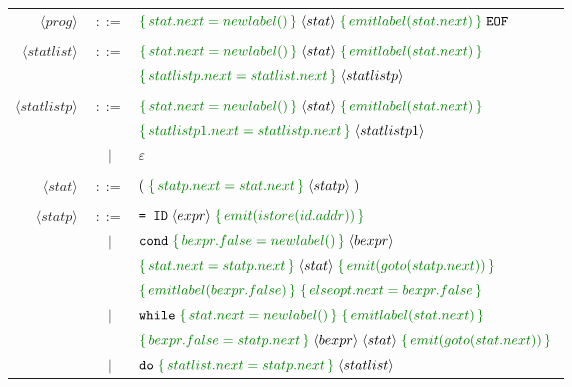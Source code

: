 \documentclass[a4paper]{article}
\newcommand{\cmd}[1]{\textcolor{MyGreen}{\{\, #1 \,\}} \;}
\newcommand{\node}[1]{\langle #1 \rangle \;}
\newcommand{\tag}[1]{\texttt{#1} \;}
\begin{document}
\begin{center}
\begin{tabular}{ r c l }
  $\node{prog}$       & $::=$ & $\cmd{stat.next = newlabel()} \node{stat} \cmd{emitlabel(stat.next)} \tag{EOF}$ \\\\
  $\node{statlist}$   & $::=$ & $\cmd{stat.next = newlabel()} \node{stat} \cmd{emitlabel(stat.next)}$ \\ 
                      &       & $\cmd{statlistp.next = statlist.next}\node{statlistp}$ \\\\
  $\node{statlistp}$  & $::=$ & $\cmd{stat.next = newlabel()} \node{stat} \cmd{emitlabel(stat.next)}$ \\ 
                      &       & $\cmd{statlistp1.next = statlistp.next}\node{statlistp1}$ \\

                      &  $|$  & $\varepsilon$ \\\\
  $\node{stat}$       & $::=$ & $(\; \cmd{statp.next = stat.next} \node{statp})$ \\\\
  $\node{statp}$      & $::=$ & $\texttt{= ID}\; \node{expr} \cmd{emit(istore(id.addr))}$ \\

                      &  $|$  & $\tag{cond} \cmd{bexpr.false = newlabel()} \node{bexpr}$ \\
                      &       & $\cmd{stat.next = statp.next} \node{stat} \cmd{emit(goto(statp.next))}$ \\
                      &       & $\cmd{emitlabel(bexpr.false)} \cmd{elseopt.next = bexpr.false}$ \\

                      &  $|$  & $\tag{while} \cmd{stat.next = newlabel()} \cmd{emitlabel(stat.next)}$ \\
                      &       & $\cmd{bexpr.false = statp.next} \node{bexpr} \node{stat} \cmd{emit(goto(stat.next))}$ \\

                      &  $|$  & $\tag{do} \cmd{statlist.next = statp.next} \node{statlist}$ \\


\end{tabular}
\end{center}
\end{document}
